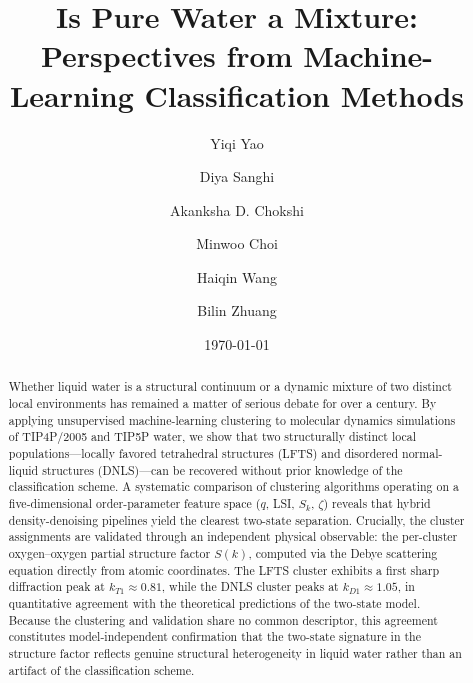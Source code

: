 \documentclass[aps, amsmath,amssymb, reprint, twocolumn, superscriptaddress]{revtex4-1}
\begin{document}
\title{Is Pure Water a Mixture: Perspectives from Machine-Learning Classification Methods}
\author{Yiqi Yao}
\author{Diya Sanghi}
\author{Akanksha D. Chokshi}
\author{Minwoo Choi}
\author{Haiqin Wang}
\author{Bilin Zhuang}
\date{\today}

\begin{abstract}
Whether liquid water is a structural continuum or a dynamic mixture of two distinct local environments 
has remained a matter of serious debate for over a century. By applying unsupervised machine-learning
clustering to molecular dynamics simulations of TIP4P/2005 and TIP5P water, we show that two
structurally distinct local populations---locally favored tetrahedral structures (LFTS) and disordered
normal-liquid structures (DNLS)---can be recovered without prior knowledge of the classification scheme.
A systematic comparison of clustering algorithms operating on a five-dimensional order-parameter feature
space ($q$, LSI, $S_k$, $\zeta$) reveals that hybrid density-denoising pipelines yield the clearest
two-state separation. Crucially, the cluster assignments are validated through an independent physical
observable: the per-cluster oxygen--oxygen partial structure factor $S(k)$, computed via the Debye
scattering equation directly from atomic coordinates. The LFTS cluster exhibits a first sharp diffraction
peak at $k_{T1}\approx 0.81$, while the DNLS cluster peaks at $k_{D1} \approx 1.05$, in quantitative
agreement with the theoretical predictions of the two-state model. Because the clustering and validation
share no common descriptor, this agreement constitutes model-independent confirmation that the two-state
signature in the structure factor reflects genuine structural heterogeneity in liquid water rather than an
artifact of the classification scheme.
\end{abstract}

\maketitle
\end{document}
